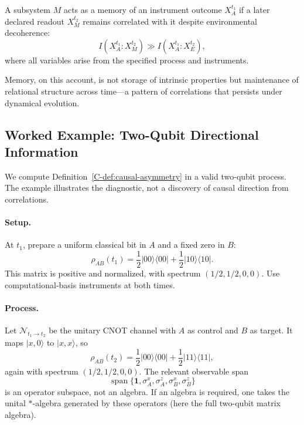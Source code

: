 \documentclass[12pt,a4paper,openany]{book}
\begin{document}
A subsystem $M$ acts as a memory of an instrument outcome $X_A^{t_1}$ if a later declared readout $X_M^{t_2}$ remains correlated with it despite environmental decoherence:
\begin{equation}
I(X_A^{t_1}:X_M^{t_2})
\gg I(X_A^{t_1}:X_E^{t_2}),
\end{equation}
where all variables arise from the specified process and instruments.

Memory, on this account, is not storage of intrinsic properties but maintenance of relational structure across time—a pattern of correlations that persists under dynamical evolution.

\subsection{Worked Example: Two-Qubit Directional Information}
\label{C-sec:I.5example}

We compute Definition~\ref{C-def:causal-asymmetry} in a valid two-qubit process.  The example illustrates the diagnostic, not a discovery of causal direction from correlations.

\paragraph{Setup.}
At $t_1$, prepare a uniform classical bit in $A$ and a fixed zero in $B$:
\begin{equation}
\rho_{AB}(t_1)
=\frac12|00\rangle\langle00|
+\frac12|10\rangle\langle10|.
\end{equation}
This matrix is positive and normalized, with spectrum $(1/2,1/2,0,0)$.  Use computational-basis instruments at both times.

\paragraph{Process.}
Let $\mathcal N_{t_1\to t_2}$ be the unitary CNOT channel with $A$ as control and $B$ as target.  It maps $|x,0\rangle$ to $|x,x\rangle$, so
\begin{equation}
\rho_{AB}(t_2)
=\frac12|00\rangle\langle00|
+\frac12|11\rangle\langle11|,
\end{equation}
again with spectrum $(1/2,1/2,0,0)$.  The relevant observable span
\[
\operatorname{span}\{\mathbf1,\sigma_A^x,\sigma_A^z,
\sigma_B^x,\sigma_B^z\}
\]
is an operator subspace, not an algebra.  If an algebra is required, one takes the unital $*$-algebra generated by these operators (here the full two-qubit matrix algebra).
\end{document}
